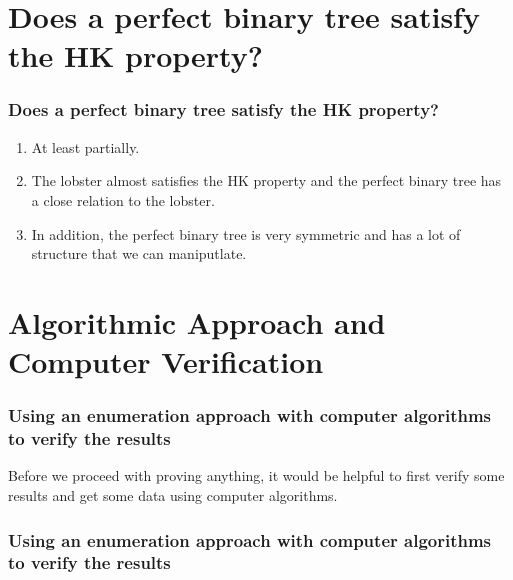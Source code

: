 \documentclass[10pt,]{beamer}
\theoremstyle{conjectureStyle}
\theoremstyle{notationStyle}
\theoremstyle{claimStyle}
\begin{document}
\section{Does a perfect binary tree satisfy the HK property?}
\begin{frame}\frametitle{Does a perfect binary tree satisfy the HK property?}
    \begin{enumerate}[<+->]
        \setlength\itemsep{2em}
        \item At least partially.
        \item The lobster almost satisfies the HK property and the perfect binary tree has a close relation to the lobster.
        \item In addition, the perfect binary tree is very symmetric and has a lot of structure that we can maniputlate.
    \end{enumerate}
\end{frame}

\section{Algorithmic Approach and Computer Verification}
\begin{frame}\frametitle{Using an enumeration approach with computer algorithms to verify the results}
    Before we proceed with proving anything, it would be helpful to first verify some results and get some data using computer algorithms.
\end{frame}

\begin{frame}\frametitle{Using an enumeration approach with computer algorithms to verify the results}
    \begin{algorithm}[H]


    \end{algorithm}
\end{frame}
\end{document}
